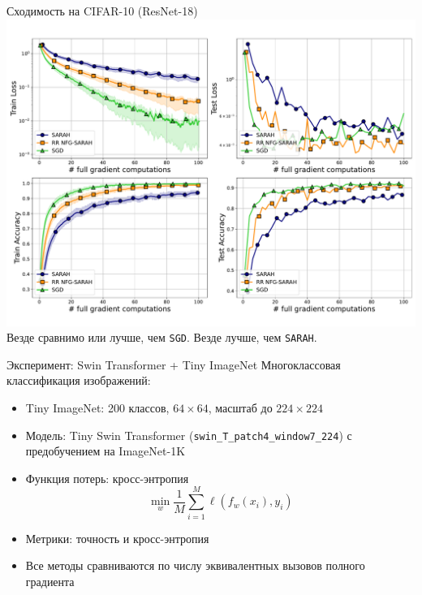 \documentclass{beamer}
\theoremstyle{plain}
\begin{document}
\begin{frame}{Сходимость на CIFAR-10 (ResNet-18)}
    \centering
    \includegraphics[width=0.9\linewidth]{../figures/sarah_10.pdf}
    \scriptsize\\
    Везде сравнимо или лучше, чем \texttt{SGD}. Везде лучше, чем \texttt{SARAH}.
\end{frame}


\begin{frame}{Эксперимент: Swin Transformer + Tiny ImageNet}
    Многоклассовая классификация изображений:
    \begin{itemize}
        \item Tiny ImageNet: 200 классов, $64\times64$, масштаб до $224\times224$
        \item Модель: Tiny Swin Transformer (\texttt{swin\_T\_patch4\_window7\_224}) с предобучением на ImageNet-1K
        \item Функция потерь: кросс-энтропия
        \[
        \min\limits_{w} \frac{1}{M} \sum_{i=1}^{M} \ell(f_w(x_i), y_i)
        \]
        \item Метрики: точность и кросс-энтропия
        \item Все методы сравниваются по числу эквивалентных вызовов полного градиента
    \end{itemize}
\end{frame}
\end{document}
